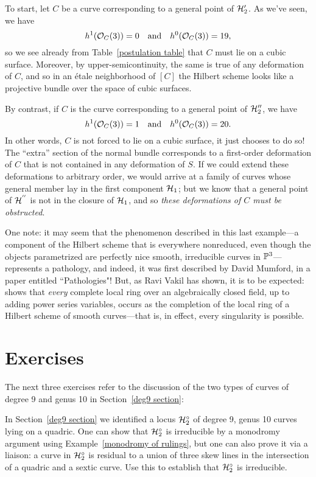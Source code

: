 To start, let $C$ be a curve corresponding to a general point of $\cH_{2}'$. As we've seen, we have
$$
h^1(\cO_C(3)) = 0 \quad \text{and} \quad h^0(\cO_C(3)) = 19,
$$
so we see already from Table~\ref{postulation table} that $C$ must lie on a cubic surface. Moreover, by upper-semicontinuity, the same is true of any deformation of $C$, and so in an \'etale neighborhood of $[C]$ the Hilbert scheme looks like a projective bundle over the space of cubic surfaces.

By contrast, if $C$ is the curve corresponding to a general point of $\cH_{2}''$, we have
$$
h^1(\cO_C(3)) = 1 \quad \text{and} \quad h^0(\cO_C(3)) = 20.
$$
In other words, $C$ is not forced to lie on a cubic surface, it just chooses to do so! The ``extra'' section of the normal bundle corresponds to a first-order deformation of $C$ that is not contained in any deformation of $S$. 
If we could extend these deformations to arbitrary order, we would arrive at a family of curves whose general member lay in the first component $\cH_1$; but we know that a general point of $ \cH^{''}$ is not in the closure of $\cH_1$, and so \emph{these deformations of $C$ must be obstructed}.

One note: it may seem that the phenomenon described in this last example---a component of the Hilbert scheme that is everywhere nonreduced, even though the objects parametrized are perfectly nice smooth, irreducible curves in $\PP^3$---represents a pathology, and indeed, it was first described by David Mumford, in a paper entitled ``Pathologies"! But, as Ravi Vakil has shown, it is to be expected: \cite{MR2227692} shows that \emph{every} complete local ring over an algebraically closed field, up to adding power series variables, occurs as the completion of the local ring of a Hilbert scheme of smooth curves---that is, in effect, every singularity is possible. 

\section{Exercises}
 The next three exercises refer to the discussion of the two types of curves of degree 9 and genus 10 in Section~\ref{deg9 section}:
\begin{exercise}\label{degree 9 type 2 is irreducible}
In Section~\ref{deg9 section} we identified a locus $\cH^\circ_2$ of degree 9, genus 10 curves lying on a quadric.
One can show that $\cH^\circ_2$  is irreducible by a monodromy argument using Example~\ref{monodromy of rulings}, but one can also prove it via a liaison:  a curve in $\cH^\circ_2$ is residual to a union of three skew lines in the intersection of a quadric and a sextic curve. Use this to establish that $\cH^\circ_2$ is irreducible.
\end{exercise}

